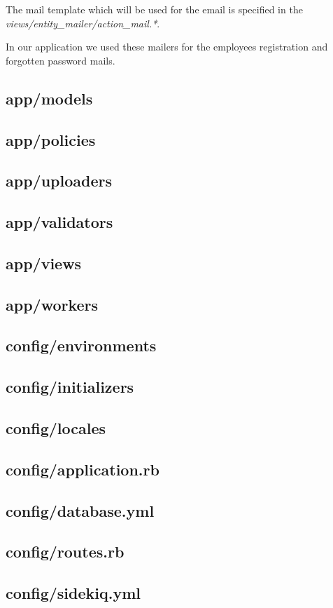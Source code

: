 		 The mail template which will be used for the email is specified in the \textit{views/entity\_mailer/action\_mail.*}.
		 
		 In our application we used these mailers for the employees registration and forgotten password mails.
	\subsection{app/models}
		
	\subsection{app/policies}
	\subsection{app/uploaders}
	\subsection{app/validators}
	\subsection{app/views}
	\subsection{app/workers}
	\subsection{config/environments}
	\subsection{config/initializers}
	\subsection{config/locales}
	\subsection{config/application.rb}
	\subsection{config/database.yml}
	\subsection{config/routes.rb}
	\subsection{config/sidekiq.yml}
